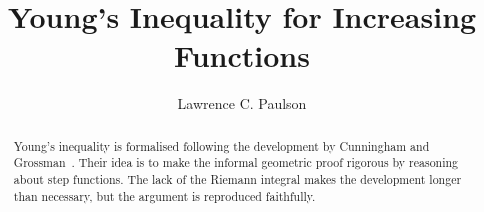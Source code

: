 \documentclass[11pt,a4paper]{report}
\begin{document}
\title{Young's Inequality for Increasing Functions}
\author{Lawrence C. Paulson}
\maketitle

\begin{abstract}
Young's inequality is formalised following the development by Cunningham and Grossman~\cite{cunningham-youngs}.
Their idea is to make the informal geometric proof rigorous by reasoning about step functions.
The lack of the Riemann integral makes the development longer than necessary, but the argument is reproduced faithfully.
\end{abstract}

\tableofcontents





\end{document}
